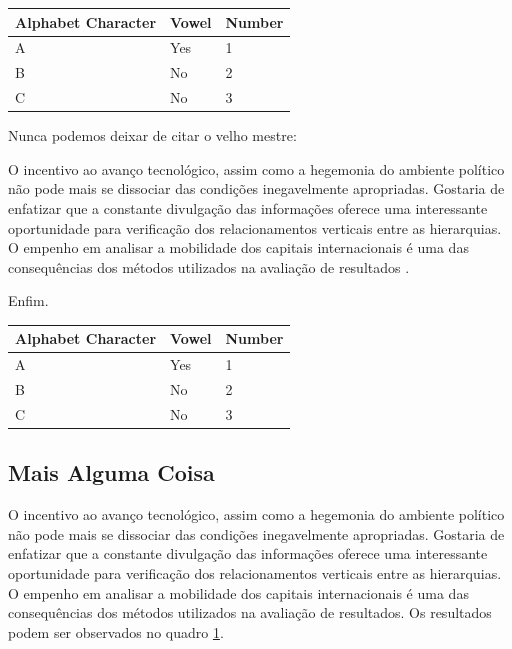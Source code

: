 \documentclass[font=plain,chapter=TITLE,section=Title,espaco=duplo,tocpage=plain,appendix=Name,floatnumber=continuous]{abnt}
\begin{document}
\begin{table}[h!b!p!]
\centering
\begin{tabular}{lll}
\hline
Alphabet Character & Vowel & Number \\
\hline
A & Yes & 1 \\
B & No & 2 \\
C & No & 3 \\
\hline
\end{tabular}
\label{quadro:outrola}
\end{table}

Nunca podemos deixar de citar o velho mestre:

\begin{citacao}
O incentivo ao avanço tecnológico, assim como a hegemonia do ambiente
político não pode mais se dissociar das condições inegavelmente
apropriadas. Gostaria de enfatizar que a constante divulgação das
informações oferece uma interessante oportunidade para verificação dos
relacionamentos verticais entre as hierarquias. O empenho em analisar a
mobilidade dos capitais internacionais é uma das consequências dos métodos
utilizados na avaliação de resultados \cite{semolini2002support}.
\end{citacao}

Enfim.

\begin{table}
\centering
\begin{tabular}{lll}
\hline
Alphabet Character & Vowel & Number \\
\hline
A & Yes & 1 \\
B & No & 2 \\
C & No & 3 \\
\hline
\end{tabular}
\end{table}

\subsection{Mais Alguma Coisa}

O incentivo ao avanço tecnológico, assim como a hegemonia do ambiente político
não pode mais se dissociar das condições inegavelmente apropriadas. Gostaria de
enfatizar que a constante divulgação das informações oferece uma interessante
oportunidade para verificação dos relacionamentos verticais entre as
hierarquias. O empenho em analisar a mobilidade dos capitais internacionais é
uma das consequências dos métodos utilizados na avaliação de resultados. Os
resultados podem ser observados no quadro \ref{quadro:outrola}.
\end{document}
